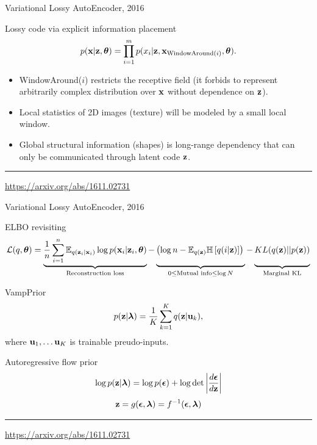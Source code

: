 \begin{frame}{Variational Lossy AutoEncoder, 2016}
\begin{block}{Lossy code via explicit information placement}
\[
    p(\mathbf{x} | \mathbf{z}, \boldsymbol{\theta}) = \prod_{i=1}^m p(x_i | \mathbf{z}, \mathbf{x}_{\text{WindowAround}(i)}, \boldsymbol{\theta}).
\]
\begin{itemize}
    \item WindowAround($i$) restricts the receptive field (it forbids to represent arbitrarily complex distribution over $\mathbf{x}$ without dependence on $\mathbf{z}$). 
    \item Local statistics of 2D images (texture) will be modeled by a small local window.
    \item Global structural information (shapes) is long-range dependency that can only be communicated through latent code $\mathbf{z}$. 
\end{itemize}
\end{block}
\vspace{0.7cm}
\vfill
\hrule\medskip
{\scriptsize \href{https://arxiv.org/abs/1611.02731}{https://arxiv.org/abs/1611.02731}}
\end{frame}
\begin{frame}{Variational Lossy AutoEncoder, 2016}
	
	\begin{block}{ELBO revisiting}
		\vspace{-0.3cm}
		{\footnotesize
			\[
			\mathcal{L}(q, \btheta) = \underbrace{\frac{1}{n} \sum_{i=1}^n \mathbb{E}_{q(\bz_i | \bx_i)} \log p(\bx_i | \bz_i, \btheta)}_{\text{Reconstruction loss}} - \underbrace{\left(\log n - \mathbb{E}_{q(\bz)} \mathbb{H} \left[ q(i | \bz) \right] \right)\vphantom{\sum_{i=1}}}_{0 \leq \text{Mutual info} \leq \log N } - \underbrace{KL(q(\bz) || p(\bz))\vphantom{\sum_{i=1}}}_{\text{Marginal KL}}
			\]}
	\end{block}
	\vspace{-0.5cm}
	\begin{block}{VampPrior}
		\vspace{-0.5cm}
		\[
			p(\mathbf{z} | \boldsymbol{\lambda}) = \frac{1}{K} \sum_{k=1}^K q(\mathbf{z} | \mathbf{u}_k),
		\]
	where $\mathbf{u}_1, \dots \mathbf{u}_K$ is trainable preudo-inputs.
	\end{block}
	\begin{block}{Autoregressive flow prior}
		\vspace{-0.5cm}
		\[
			\log p(\mathbf{z} | \boldsymbol{\lambda}) = \log p(\boldsymbol{\epsilon}) + \log \det \left | \frac{d \boldsymbol{\epsilon}}{d\mathbf{z}}\right|
		\]
		\[
			\mathbf{z} = g(\boldsymbol{\epsilon}, \boldsymbol{\lambda}) = f^{-1}(\boldsymbol{\epsilon}, \boldsymbol{\lambda}) 
		\]
	\end{block}
	\vfill
	\hrule\medskip
	{\scriptsize \href{https://arxiv.org/abs/1611.02731}{https://arxiv.org/abs/1611.02731}}
\end{frame}
